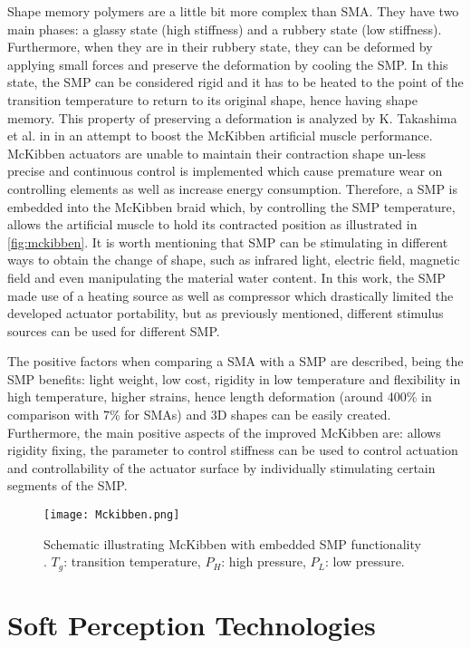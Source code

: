 Shape memory polymers are a little bit more complex than SMA. They have two main phases: a glassy state (high stiffness) and a rubbery state (low stiffness). Furthermore, when they are in their rubbery state, they can be deformed by applying small forces and preserve the deformation by cooling the SMP. In this state, the SMP can be considered rigid and it has to be heated to the point of the transition temperature to return to its original shape, hence having shape memory. This property of preserving a deformation is analyzed by K. Takashima et al. in \cite{Takashima2010} in an attempt to boost the McKibben artificial muscle performance. McKibben actuators are unable to maintain their contraction shape un-less precise and continuous control is implemented which cause premature wear on controlling elements as well as increase energy consumption. Therefore, a SMP is embedded into the McKibben braid which, by controlling the SMP temperature, allows the artificial muscle to hold its contracted position as illustrated in \autoref{fig:mckibben}. It is worth mentioning that SMP can be stimulating in different ways to obtain the change of shape, such as infrared light, electric field, magnetic field and even manipulating the material water content. In this work, the SMP made use of a heating source as well as compressor which drastically limited the developed actuator portability, but as previously mentioned, different stimulus sources can be used for different SMP.

The positive factors when comparing a SMA with a SMP are described, being the SMP benefits: light weight, low cost, rigidity in low temperature and flexibility in high temperature, higher strains, hence length deformation (around 400\% in comparison with 7\% for SMAs) and 3D shapes can be easily created. Furthermore, the main positive aspects of the improved McKibben are: allows rigidity fixing, the parameter to control stiffness can be used to control actuation and controllability of the actuator surface by individually stimulating certain segments of the SMP.

\begin{figure}[hbtp!]
    \centering
    \texttt{[image: Mckibben.png]}
    \caption{Schematic illustrating McKibben with embedded SMP functionality \cite{Takashima2010}. $T_g$: transition temperature, $P_H$: high pressure, $P_L$: low pressure. }
    \label{fig:mckibben}
\end{figure}

\section{Soft Perception Technologies}
